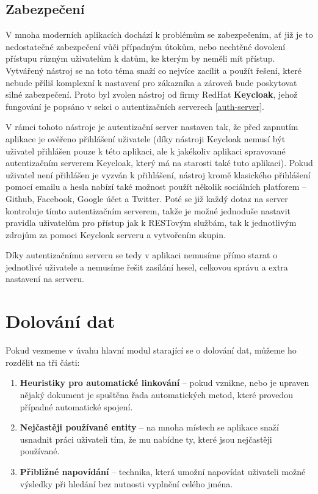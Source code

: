 \subsection{Zabezpečení}
\par V mnoha moderních aplikacích dochází k problémům se zabezpečením, ať již je to nedostatečné zabezpečení vůči případným útokům, nebo nechtěné dovolení přístupu různým uživatelům k datům, ke kterým by neměli mít přístup. Vytvářený nástroj se na toto téma snaží co nejvíce zacílit a použít řešení, které nebude příliš komplexní k nastavení pro zákazníka a zároveň bude poskytovat silné zabezpečení. Proto byl zvolen nástroj od firmy RedHat \textbf{Keycloak}, jehož fungování je popsáno v sekci o autentizačních serverech \ref{auth-server}.

\par V rámci tohoto nástroje je autentizační server nastaven tak, že před zapnutím aplikace je ověřeno přihlášení uživatele (díky nástroji Keycloak nemusí být uživatel přihlášen pouze k této aplikaci, ale k jakékoliv aplikaci spravované autentizačním serverem Keycloak, který má na starosti také tuto aplikaci). Pokud uživatel není přihlášen je vyzván k přihlášení, nástroj kromě klasického přihlášení pomocí emailu a hesla nabízí také možnost použít několik sociálních platforem -- Github, Facebook, Google účet a Twitter. Poté se již každý dotaz na server kontroluje tímto autentizačním serverem, takže je možné jednoduše nastavit pravidla uživatelům pro přístup jak k RESTovým službám, tak k jednotlivým zdrojům za pomoci Keycloak serveru a vytvořením skupin.

\par Díky autentizačnímu serveru se tedy v aplikaci nemusíme přímo starat o jednotlivé uživatele a nemusíme řešit zasílání hesel, celkovou správu a extra nastavení na serveru.

\section{Dolování dat}
\par Pokud vezmeme v úvahu hlavní modul starající se o dolování dat, můžeme ho rozdělit na tři části:
\begin{enumerate}
  \item \textbf{Heuristiky pro automatické linkování} -- pokud vznikne, nebo je upraven nějaký dokument je spuštěna řada automatických metod, které provedou případné automatické spojení.
  \item \textbf{Nejčastěji používané entity} -- na mnoha místech se aplikace snaží usnadnit práci uživateli tím, že mu nabídne ty, které jsou nejčastěji používané.
  \item \textbf{Přibližné napovídání} -- technika, která umožní napovídat uživateli možné výsledky při hledání bez nutnosti vyplnění celého jména.
\end{enumerate}

